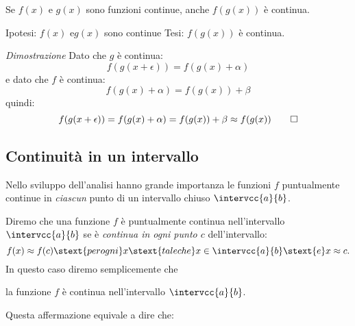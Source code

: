 
\begin{teorema}
Se \(f(x)\) e \(g(x)\) sono funzioni continue, anche \(f(g(x))\) è continua.
\end{teorema}

\noindent Ipotesi: 
\(f(x) \text{ e} g(x)\) sono continue
\tab Tesi: 
\(f(g(x))\) è continua.

\emph{Dimostrazione}
Dato che \(g\) è continua: 
\[f(g(x+\epsilon)) = f(g(x)+\alpha)\]
e dato che \(f\) è continua: 
\[f(g(x)+\alpha)=f(g(x))+\beta\]
quindi: 
\[f(g(x+\epsilon)) = f(g(x)+\alpha) = f(g(x))+\beta \approx f(g(x)) \qed\]

\subsection{Continuità in un intervallo}
\label{subsec:cont_definizione}

Nello sviluppo dell'analisi hanno grande importanza le funzioni 
\(f\) puntualmente continue in \emph{ciascun} punto di un intervallo chiuso 
\(\intervcc{a}{b}\).

Diremo che una funzione \(f\) è puntualmente continua nell'intervallo 
\(\intervcc{a}{b}\) se è \emph{continua in ogni punto \(c\)} dell'intervallo:
\[f(x) \approx f(c) \stext{per ogni} x \stext{tale che} 
x \in \intervcc{a}{b} \stext{e} x \approx c.\] 
In questo caso diremo semplicemente che 
\begin{center}
la funzione \(f\) è continua nell'intervallo \(\intervcc{a}{b}\). 
\end{center}
Questa affermazione equivale a dire che:

 
